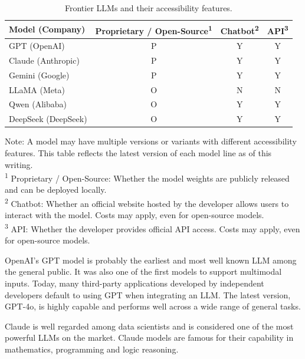 \begin{table}[!htb]
	\centering
	\caption{Frontier LLMs and their accessibility features.} 
	\label{tab:frontiermodels}
	\begin{tabular}{lccc}
		\hline
		Model (Company) & Proprietary / Open-Source\textsuperscript{1} & Chatbot\textsuperscript{2} & API\textsuperscript{3} \\
		\hline
		GPT (OpenAI)           & P & Y & Y \\
		Claude (Anthropic)     & P & Y & Y \\
		Gemini (Google)        & P & Y & Y \\
		LLaMA (Meta)           & O & N & N \\
		Qwen (Alibaba)         & O & Y & Y \\
		DeepSeek (DeepSeek)    & O & Y & Y \\
		\hline
	\end{tabular}
	
	\vspace{0.5em}
	\begin{flushleft}
		\tiny
		Note: A model may have multiple versions or variants with different accessibility features. This table reflects the latest version of each model line as of this writing. \\
		\textsuperscript{1} Proprietary / Open-Source: Whether the model weights are publicly released and can be deployed locally. \\
		\textsuperscript{2} Chatbot: Whether an official website hosted by the developer allows users to interact with the model. Costs may apply, even for open-source models. \\
		\textsuperscript{3} API: Whether the developer provides official API access. Costs may apply, even for open-source models.
	\end{flushleft}
\end{table}


OpenAI's GPT model is probably the earliest and most well known LLM among the general public. It was also one of the first models to support multimodal inputs. Today, many third-party applications developed by independent developers default to using GPT when integrating an LLM. The latest version, GPT-4o, is highly capable and performs well across a wide range of general tasks.

Claude is well regarded among data scientists and is considered one of the most powerful LLMs on the market. Claude models are famous for their capability in mathematics, programming and logic reasoning.

